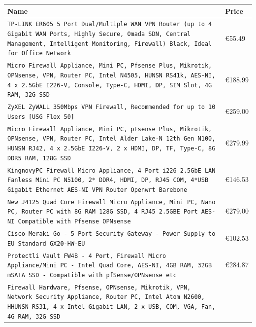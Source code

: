 \documentclass[mscthesis]{usiinfthesis}
\begin{document}

\begin{table}[H]
  \begin{tabular}{|p{113mm}|p{12mm}|}
    \hline
    Name & Price   \\
    \hline
    \texttt{TP-LINK ER605 5 Port Dual/Multiple WAN VPN Router (up to 4 Gigabit WAN Ports, Highly Secure, Omada SDN, Central Management, Intelligent Monitoring, Firewall) Black, Ideal for Office Network
    }    & €55.49  \\
    \texttt{Micro Firewall Appliance, Mini PC, Pfsense Plus, Mikrotik, OPNsense, VPN, Router PC, Intel N4505, HUNSN RS41k, AES-NI, 4 x 2.5GbE I226-V, Console, Type-C, HDMI, DP, SIM Slot, 4G RAM, 32G SSD
    }    & €188.99 \\
    \texttt{ZyXEL ZyWALL 350Mbps VPN Firewall, Recommended for up to 10 Users [USG Flex 50]
    }    & €259.00 \\
    \texttt{Micro Firewall Appliance, Mini PC, pFsense Plus, Mikrotik, OPNsense, VPN, Router PC, Intel Alder Lake-N 12th Gen N100, HUNSN RJ42, 4 x 2.5GbE I226-V, 2 x HDMI, DP, TF, Type-C, 8G DDR5 RAM, 128G SSD
    }    & €279.99 \\
    \texttt{KingnovyPC Firewall Micro Appliance, 4 Port i226 2.5GbE LAN Fanless Mini PC N5100, 2* DDR4, HDMI, DP, RJ45 COM, 4*USB Gigabit Ethernet AES-NI VPN Router Openwrt Barebone
    }    & €146.53 \\
    \texttt{New J4125 Quad Core Firewall Micro Appliance, Mini PC, Nano PC, Router PC with 8G RAM 128G SSD, 4 RJ45 2.5GBE Port AES-NI Compatible with Pfsense OPNsense
    }    & €279.00 \\
    \texttt{Cisco Meraki Go - 5 Port Security Gateway - Power Supply to EU Standard GX20-HW-EU
    }    & €102.53 \\
    \texttt{Protectli Vault FW4B - 4 Port, Firewall Micro Appliance/Mini PC - Intel Quad Core, AES-NI, 4GB RAM, 32GB mSATA SSD - Compatible with pfSense/OPNsense etc
    }    & €284.87 \\
    \texttt{Firewall Hardware, Pfsense, OPNsense, Mikrotik, VPN, Network Security Appliance, Router PC, Intel Atom N2600, HHUNSN RS31, 4 x Intel Gigabit LAN, 2 x USB, COM, VGA, Fan, 4G RAM, 32G SSD
}
\end{tabular}
\end{table}
\end{document}
